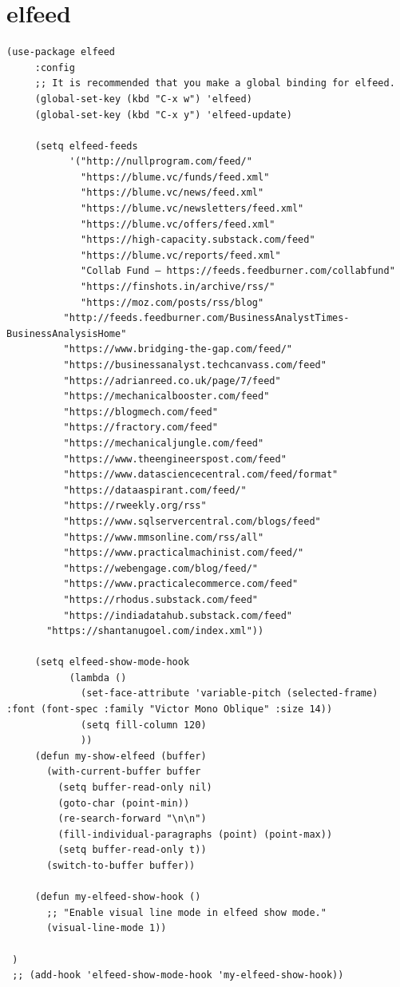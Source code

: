 \documentclass[11pt]{article}
\begin{document}
\section{elfeed}
\label{sec:org32698bb}
\begin{verbatim}
(use-package elfeed
     :config
     ;; It is recommended that you make a global binding for elfeed.
     (global-set-key (kbd "C-x w") 'elfeed)
     (global-set-key (kbd "C-x y") 'elfeed-update)

     (setq elfeed-feeds
           '("http://nullprogram.com/feed/"
             "https://blume.vc/funds/feed.xml"
             "https://blume.vc/news/feed.xml"
             "https://blume.vc/newsletters/feed.xml"
             "https://blume.vc/offers/feed.xml"
             "https://high-capacity.substack.com/feed"
             "https://blume.vc/reports/feed.xml"
             "Collab Fund — https://feeds.feedburner.com/collabfund"
             "https://finshots.in/archive/rss/"
             "https://moz.com/posts/rss/blog"
          "http://feeds.feedburner.com/BusinessAnalystTimes-BusinessAnalysisHome"
          "https://www.bridging-the-gap.com/feed/"
          "https://businessanalyst.techcanvass.com/feed"
          "https://adrianreed.co.uk/page/7/feed"
          "https://mechanicalbooster.com/feed"
          "https://blogmech.com/feed"
          "https://fractory.com/feed"
          "https://mechanicaljungle.com/feed"
          "https://www.theengineerspost.com/feed"
          "https://www.datasciencecentral.com/feed/format"
          "https://dataaspirant.com/feed/"
          "https://rweekly.org/rss"
          "https://www.sqlservercentral.com/blogs/feed"
          "https://www.mmsonline.com/rss/all"
          "https://www.practicalmachinist.com/feed/"
          "https://webengage.com/blog/feed/"
          "https://www.practicalecommerce.com/feed"
          "https://rhodus.substack.com/feed"
          "https://indiadatahub.substack.com/feed"
       "https://shantanugoel.com/index.xml"))

     (setq elfeed-show-mode-hook
           (lambda ()
             (set-face-attribute 'variable-pitch (selected-frame) :font (font-spec :family "Victor Mono Oblique" :size 14))
             (setq fill-column 120)
             ))
     (defun my-show-elfeed (buffer)
       (with-current-buffer buffer
         (setq buffer-read-only nil)
         (goto-char (point-min))
         (re-search-forward "\n\n")
         (fill-individual-paragraphs (point) (point-max))
         (setq buffer-read-only t))
       (switch-to-buffer buffer))

     (defun my-elfeed-show-hook ()
       ;; "Enable visual line mode in elfeed show mode."
       (visual-line-mode 1)) 

 )
 ;; (add-hook 'elfeed-show-mode-hook 'my-elfeed-show-hook))
\end{verbatim}
\end{document}
